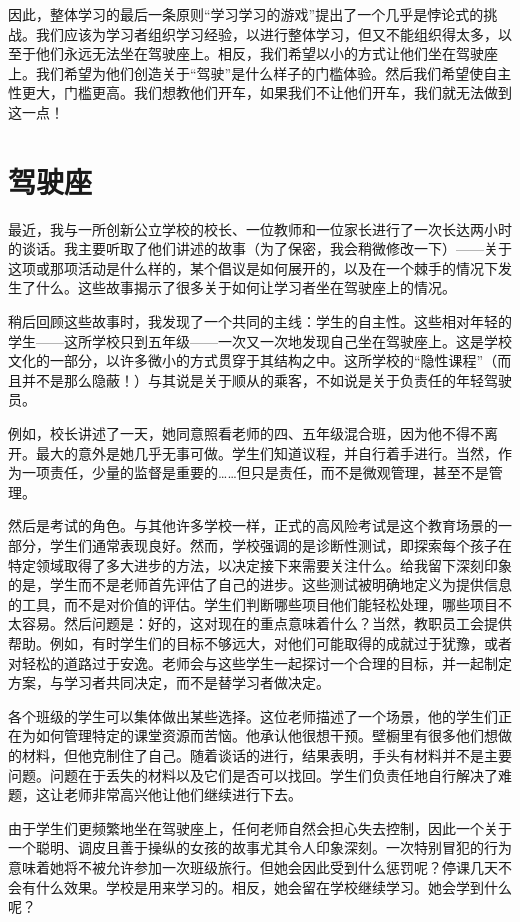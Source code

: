 因此，整体学习的最后一条原则“学习学习的游戏”提出了一个几乎是悖论式的挑战。我们应该为学习者组织学习经验，以进行整体学习，但又不能组织得太多，以至于他们永远无法坐在驾驶座上。相反，我们希望以小的方式让他们坐在驾驶座上。我们希望为他们创造关于“驾驶”是什么样子的门槛体验。然后我们希望使自主性更大，门槛更高。我们想教他们开车，如果我们不让他们开车，我们就无法做到这一点！

\section*{驾驶座}

最近，我与一所创新公立学校的校长、一位教师和一位家长进行了一次长达两小时的谈话。我主要听取了他们讲述的故事（为了保密，我会稍微修改一下）——关于这项或那项活动是什么样的，某个倡议是如何展开的，以及在一个棘手的情况下发生了什么。这些故事揭示了很多关于如何让学习者坐在驾驶座上的情况。

稍后回顾这些故事时，我发现了一个共同的主线：学生的自主性。这些相对年轻的学生——这所学校只到五年级——一次又一次地发现自己坐在驾驶座上。这是学校文化的一部分，以许多微小的方式贯穿于其结构之中。这所学校的“隐性课程”（而且并不是那么隐蔽！）与其说是关于顺从的乘客，不如说是关于负责任的年轻驾驶员。

例如，校长讲述了一天，她同意照看老师的四、五年级混合班，因为他不得不离开。最大的意外是她几乎无事可做。学生们知道议程，并自行着手进行。当然，作为一项责任，少量的监督是重要的……但只是责任，而不是微观管理，甚至不是管理。

然后是考试的角色。与其他许多学校一样，正式的高风险考试是这个教育场景的一部分，学生们通常表现良好。然而，学校强调的是诊断性测试，即探索每个孩子在特定领域取得了多大进步的方法，以决定接下来需要关注什么。给我留下深刻印象的是，学生而不是老师首先评估了自己的进步。这些测试被明确地定义为提供信息的工具，而不是对价值的评估。学生们判断哪些项目他们能轻松处理，哪些项目不太容易。然后问题是：好的，这对现在的重点意味着什么？当然，教职员工会提供帮助。例如，有时学生们的目标不够远大，对他们可能取得的成就过于犹豫，或者对轻松的道路过于安逸。老师会与这些学生一起探讨一个合理的目标，并一起制定方案，与学习者共同决定，而不是替学习者做决定。

各个班级的学生可以集体做出某些选择。这位老师描述了一个场景，他的学生们正在为如何管理特定的课堂资源而苦恼。他承认他很想干预。壁橱里有很多他们想做的材料，但他克制住了自己。随着谈话的进行，结果表明，手头有材料并不是主要问题。问题在于丢失的材料以及它们是否可以找回。学生们负责任地自行解决了难题，这让老师非常高兴他让他们继续进行下去。

由于学生们更频繁地坐在驾驶座上，任何老师自然会担心失去控制，因此一个关于一个聪明、调皮且善于操纵的女孩的故事尤其令人印象深刻。一次特别冒犯的行为意味着她将不被允许参加一次班级旅行。但她会因此受到什么惩罚呢？停课几天不会有什么效果。学校是用来学习的。相反，她会留在学校继续学习。她会学到什么呢？

